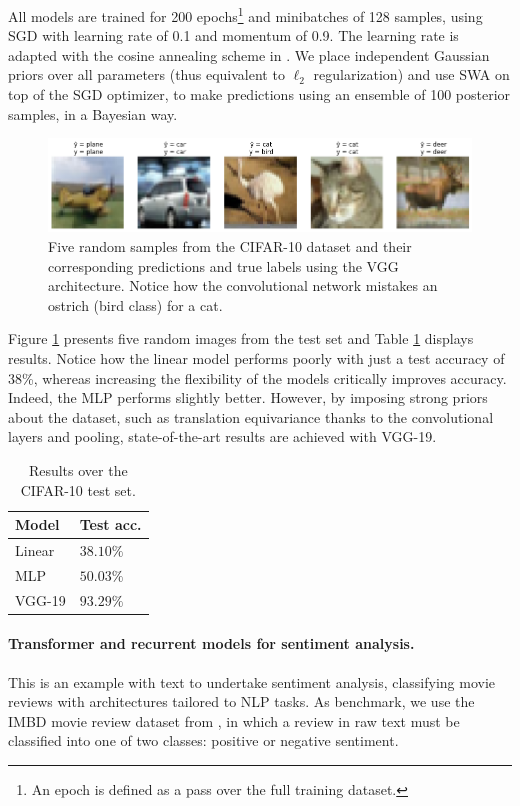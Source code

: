 All models are trained for 200 epochs\footnote{An epoch is defined as a pass over the full training dataset.} and minibatches of 128 samples, using SGD with learning rate of 0.1 and  momentum of 0.9.
The learning rate is adapted with the cosine annealing scheme in  \textcite{loshchilov2016sgdr}. We place  {independent} Gaussian priors over all parameters (thus equivalent to $\ell_2$ regularization) and use SWA on top of the SGD optimizer, to make predictions using an ensemble of   {100 posterior samples}, in a Bayesian way.

\begin{figure}[hbt]
\centering
  \includegraphics[width=1.\linewidth]{figures/cifar2.png}
  \caption{ {Five random samples from the CIFAR-10 dataset and their corresponding predictions and true labels using the VGG architecture. Notice how the convolutional network mistakes an ostrich (bird class) for a cat.}}
  \label{fig:cifar}
\end{figure}

Figure \ref{fig:cifar} presents five random images from the test set
and Table \ref{tab:cnn} displays results. Notice how the linear model performs poorly with just a test accuracy of 38\%, whereas increasing the flexibility of the models critically improves 
accuracy. Indeed, the MLP performs slightly better.
However, by imposing strong priors about the dataset, such as translation equivariance thanks to the convolutional layers and pooling, state-of-the-art results are achieved with VGG-19.

\begin{table}[ht]
\caption{Results over the CIFAR-10 test set.}
\centering
\begin{tabular}{ll}
Model & Test acc. \\
\hline
Linear &  $38.10\%$ \\
MLP &  $50.03\%$\\
VGG-19 &  $93.29\%$ 
\end{tabular}
\label{tab:cnn}
\end{table}

\paragraph{Transformer and recurrent models for sentiment analysis.}
This is an example with text to undertake sentiment analysis, classifying movie reviews with architectures tailored to NLP tasks. As benchmark, we use the IMBD movie review dataset 
from \parencite{maas-EtAl:2011:ACL-HLT2011}, in which a review in raw text must be classified into one of two classes: positive or negative
sentiment. 

